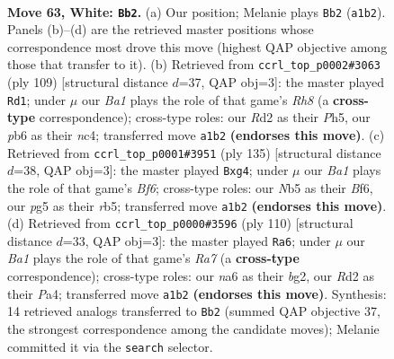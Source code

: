 \documentclass[11pt]{article}
\begin{document}
\clearpage

\begin{figure}[p]\centering
\begin{subfigure}{0.46\textwidth}\centering
\resizebox{\linewidth}{!}{%
\newchessgame
\chessboard[
  setfen={8/4p2k/npr5/pN4p1/P1p5/2P3K1/3R4/B7 w - - 6 63},
  showmover=false,
  pgfstyle=straightmove, color=movearrow, markmove={a1-b2}
]}
\caption{}
\end{subfigure}\hfill
\begin{subfigure}{0.46\textwidth}\centering
\resizebox{\linewidth}{!}{%
\newchessgame
\chessboard[
  setfen={8/6k1/2n3p1/6Pp/2N1R2P/1p4K1/1P6/7r b - - 12 55},
  showmover=false,
  pgfstyle=straightmove, color=movearrow, markmove={h1-d1}
]}
\caption{}
\end{subfigure}
\\[4pt]
\begin{subfigure}{0.46\textwidth}\centering
\resizebox{\linewidth}{!}{%
\newchessgame
\chessboard[
  setfen={8/2k3p1/5b1p/1R3P1P/1P4P1/P2K1b2/8/8 b - - 0 68},
  showmover=false,
  pgfstyle=straightmove, color=movearrow, markmove={f3-g4}
]}
\caption{}
\end{subfigure}\hfill
\begin{subfigure}{0.46\textwidth}\centering
\resizebox{\linewidth}{!}{%
\newchessgame
\chessboard[
  setfen={6k1/R7/1p3r1p/4N1p1/P2P1p2/7P/4KPb1/8 w - - 4 56},
  showmover=false,
  pgfstyle=straightmove, color=movearrow, markmove={a7-a6}
]}
\caption{}
\end{subfigure}
\caption{\textbf{Move 63, White: \texttt{Bb2}.} (a) Our position; Melanie plays \texttt{Bb2} (\texttt{a1b2}). Panels (b)--(d) are the retrieved master positions whose correspondence most drove this move (highest QAP objective among those that transfer to it). (b) Retrieved from \texttt{ccrl\_top\_p0002\#3063} (ply 109) [structural distance $d$=37, QAP obj=3]: the master played \texttt{Rd1}; under $\mu$ our \emph{Ba1} plays the role of that game's \emph{Rh8} (a \textbf{cross-type} correspondence); cross-type roles: our \emph{R}d2 as their \emph{P}h5, our \emph{p}b6 as their \emph{n}c4; transferred move \texttt{a1b2} \textbf{(endorses this move)}. (c) Retrieved from \texttt{ccrl\_top\_p0001\#3951} (ply 135) [structural distance $d$=38, QAP obj=3]: the master played \texttt{Bxg4}; under $\mu$ our \emph{Ba1} plays the role of that game's \emph{Bf6}; cross-type roles: our \emph{N}b5 as their \emph{B}f6, our \emph{p}g5 as their \emph{r}b5; transferred move \texttt{a1b2} \textbf{(endorses this move)}. (d) Retrieved from \texttt{ccrl\_top\_p0000\#3596} (ply 110) [structural distance $d$=33, QAP obj=3]: the master played \texttt{Ra6}; under $\mu$ our \emph{Ba1} plays the role of that game's \emph{Ra7} (a \textbf{cross-type} correspondence); cross-type roles: our \emph{n}a6 as their \emph{b}g2, our \emph{R}d2 as their \emph{P}a4; transferred move \texttt{a1b2} \textbf{(endorses this move)}. Synthesis: 14 retrieved analogs transferred to \texttt{Bb2} (summed QAP objective 37, the strongest correspondence among the candidate moves); Melanie committed it via the \texttt{search} selector.}
\label{fig:thought-m124}
\end{figure}
\end{document}
